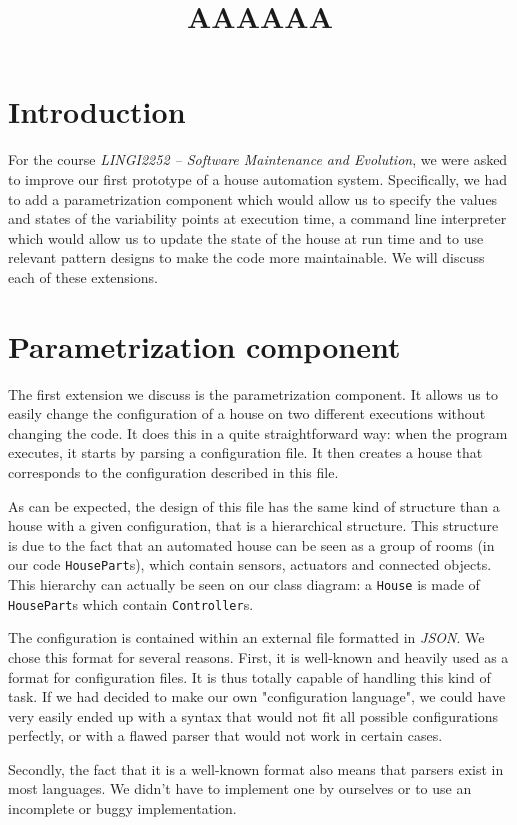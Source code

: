     \title{AAAAAA}
    \newpage

	\section{Introduction}
		For the course \textit{LINGI2252 -- Software Maintenance and Evolution}, we were asked to improve our first prototype of a house automation system. Specifically, we had to add a parametrization component which would allow us to specify the values and states of the variability points at execution time, a command line interpreter which would allow us to update the state of the house at run time and to use relevant pattern designs to make the code more maintainable. We will discuss each of these extensions.
		
	\section{Parametrization component}
		The first extension we discuss is the parametrization component.
		It allows us to easily change the configuration of a house on two different executions without changing the code.
		It does this in a quite straightforward way: when the program executes, it starts by parsing a configuration file. It then creates a house that corresponds to the configuration described in this file.
		
		As can be expected, the design of this file has the same kind of structure than a house with a given configuration, that is a hierarchical structure. This structure is due to the fact that an automated house can be seen as a group of rooms (in our code \texttt{HousePart}s), which contain sensors, actuators and connected objects. This hierarchy can actually be seen on our class diagram: a \texttt{House} is made of \texttt{HousePart}s which contain \texttt{Controller}s.
		
		The configuration is contained within an external file formatted in \textit{JSON}. We chose this format for several reasons.
		First, it is well-known and heavily used as a format for configuration files. It is thus totally capable of handling this kind of task. If we had decided to make our own "configuration language", we could have very easily ended up with a syntax that would not fit all possible configurations perfectly, or with a flawed parser that would not work in certain cases.

		Secondly, the fact that it is a well-known format also means that parsers exist in most languages. We didn't have to implement one by ourselves or to use an incomplete or buggy implementation.

